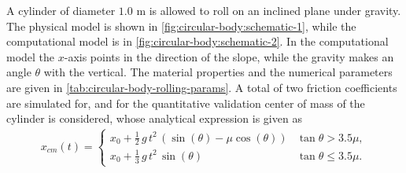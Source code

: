 \documentclass[preprint,12pt]{elsarticle}
\begin{document}
A cylinder of diameter $1.0$ m is allowed to roll on an inclined plane under
gravity. The physical model is shown in \cref{fig:circular-body:schematic-1},
while the computational model is in \cref{fig:circular-body:schematic-2}. In
the computational model the $x$-axis points in the direction of the slope,
while the gravity makes an angle $\theta$ with the vertical. The material
properties and the numerical parameters are given in
\cref{tab:circular-body-rolling-params}. A total of two friction coefficients
are simulated for, and for the quantitative validation center of mass of the
cylinder is considered, whose analytical expression is given as
\begin{align}
  \label{eq:analytical-x-cm-rolling-cylinder}
  x_{cm}(t) =
  \begin{cases}
  x_0 + \frac{1}{2} \, g \, t^2 \, (\sin(\theta) - \mu \cos(\theta)) & \tan{\theta} > 3.5\mu,\\
  x_0 + \frac{1}{3} \, g \, t^2 \, \sin(\theta) & \tan{\theta} \leq 3.5\mu.
\end{cases}
\end{align}
\end{document}
